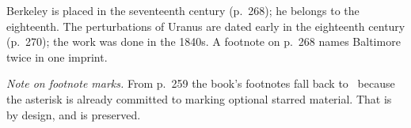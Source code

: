 \documentclass[11pt]{book}
\begin{document}
\begin{erratalist}
\item[Chapter 16 \quad Philosophy of mathematics]
Berkeley is placed in the seventeenth century (p.~268); he belongs to the
eighteenth. The perturbations of Uranus are dated early in the eighteenth
century (p.~270); the work was done in the 1840s. A footnote on p.~268 names
Baltimore twice in one imprint.

\end{erratalist}

\vspace{1em}
\noindent\emph{Note on footnote marks.} From p.~259 the book's footnotes fall
back to \dag\ because the asterisk is already committed to marking optional
starred material. That is by design, and is preserved.
\end{document}
